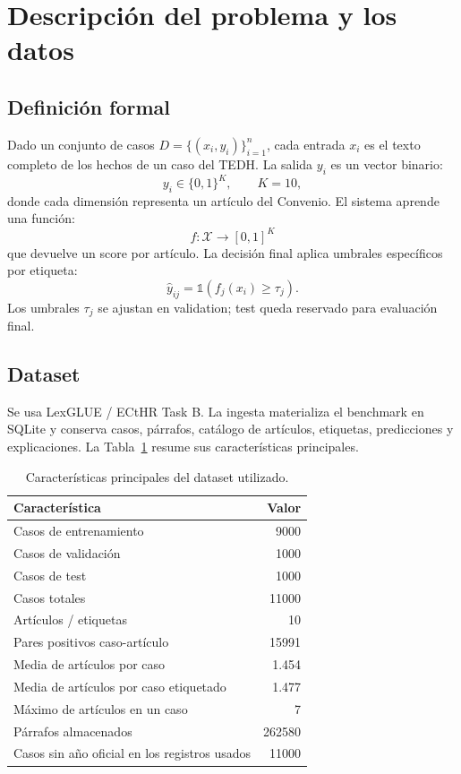 \documentclass[11pt,a4paper]{article}
\begin{document}
\section{Descripción del problema y los datos}
\label{sec:datos}

\subsection{Definición formal}

Dado un conjunto de casos \(D=\{(x_i,y_i)\}_{i=1}^{n}\), cada entrada \(x_i\) es el texto completo de los hechos de un caso del TEDH. La salida \(y_i\) es un vector binario:
\[
y_i \in \{0,1\}^{K}, \qquad K=10,
\]
donde cada dimensión representa un artículo del Convenio. El sistema aprende una función:
\[
f: \mathcal{X} \rightarrow [0,1]^K
\]
que devuelve un score por artículo. La decisión final aplica umbrales específicos por etiqueta:
\[
\hat{y}_{ij} = \mathbb{1}(f_j(x_i) \geq \tau_j).
\]
Los umbrales \(\tau_j\) se ajustan en validation; test queda reservado para evaluación final.

\subsection{Dataset}

Se usa LexGLUE / ECtHR Task B. La ingesta materializa el benchmark en SQLite y conserva casos, párrafos, catálogo de artículos, etiquetas, predicciones y explicaciones. La Tabla~\ref{tab:dataset} resume sus características principales.

\begin{table}[H]
\centering
\caption{Características principales del dataset utilizado.}
\label{tab:dataset}
\small
\begin{tabular}{@{}lr@{}}
\toprule
\textbf{Característica} & \textbf{Valor}\\
\midrule
Casos de entrenamiento & 9000\\
Casos de validación & 1000\\
Casos de test & 1000\\
Casos totales & 11000\\
Artículos / etiquetas & 10\\
Pares positivos caso-artículo & 15991\\
Media de artículos por caso & 1.454\\
Media de artículos por caso etiquetado & 1.477\\
Máximo de artículos en un caso & 7\\
Párrafos almacenados & 262580\\
Casos sin año oficial en los registros usados & 11000\\
\bottomrule
\end{tabular}
\end{table}
\end{document}
